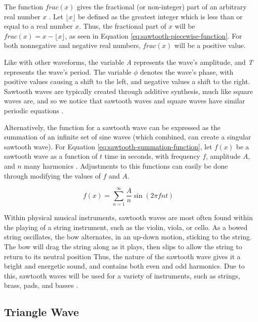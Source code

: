 The function $frac(x)$ gives the fractional (or non-integer) part of an arbitrary real number $x$ \cite{Weisstein}. Let $\lfloor x \rfloor$ be defined as the greatest integer which is less than or equal to a real number $x$. Thus, the fractional part of $x$ will be $frac(x) = x - \lfloor x \rfloor$, as seen in Equation \ref{eq:sawtooth-piecewise-function}. For both nonnegative and negative real numbers, $frac(x)$ will be a positive value.

Like with other waveforms, the variable \textit{A} represents the wave's amplitude, and \textit{T} represents the wave's period. The variable $\phi$ denotes the wave's phase, with positive values causing a shift to the left, and negative values a shift to the right. Sawtooth waves are typically created through additive synthesis, much like square waves are, and so we notice that sawtooth waves and square waves have similar periodic equations \cite{Tarr_2019}.

Alternatively, the function for a sawtooth wave can be expressed as the summation of an infinite set of sine waves (which combined, can create a singular sawtooth wave). For Equation \ref{eq:sawtooth-summation-function}, let $f(x)$ be a sawtooth wave as a function of $t$ time in seconds, with frequency $f$, amplitude $A$, and $n$ many harmonics \cite{Wellesley_College_Staff_2021}. Adjustments to this functions can easily be done through modifying the values of $f$ and $A$.

\begin{equation}
	f(x) = \sum_{n=1}^{\infty} \frac{A}{n}\sin(2\pi fnt)
	\label{eq:sawtooth-summation-function}
\end{equation}

Within physical musical instruments, sawtooth waves are most often found within the playing of a string instrument, such as the violin, viola, or cello. As a bowed string oscillates, the bow alternates, in an up-down motion, sticking to the string. The bow will drag the string along as it plays, then slips to allow the string to return to its neutral position \cite{Kapur_Cook_Salazar_Wang_2015} Thus, the nature of the sawtooth wave gives it a bright and energetic sound, and contains both even and odd harmonics. Due to this, sawtooth waves will be used for a variety of instruments, such as strings, brass, pads, and basses \cite{Dowsett_2016}. 


\subsection{Triangle Wave}

